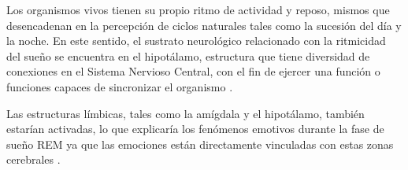 

Los organismos vivos tienen su propio ritmo de actividad y reposo, mismos que desencadenan en la 
percepci\'on de ciclos naturales tales como la sucesión del d\'ia y la noche. En este sentido, 
el sustrato neurol\'ogico relacionado con la ritmicidad del sueño se encuentra en el hipot\'alamo, 
estructura que tiene diversidad de conexiones en el Sistema Nervioso Central, con el fin de 
ejercer una funci\'on o funciones capaces de sincronizar el organismo 
\cite{FernandezConde07,Cabrera14}.


Las estructuras l\'imbicas, tales como la am\'igdala y el hipot\'alamo, tambi\'en estar\'ian 
activadas, lo que explicar\'ia los fen\'omenos emotivos durante la fase de sue\~no REM ya que 
las emociones est\'an directamente vinculadas con estas zonas cerebrales \cite{Bonet08}.



